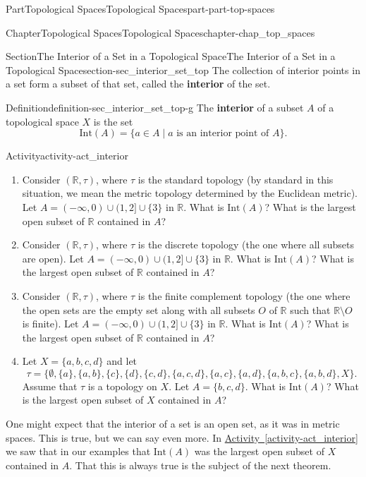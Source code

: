 \documentclass[oneside,10pt,]{book}
\newcommand{\xreffont}{\relax}
\newcommand{\terminology}[1]{\textbf{#1}}
\numberwithin{equation}{chapter}
\newcommand{\R}{\mathbb{R}}
\newcommand{\Int}{\text{Int}}
\begin{document}
\begin{partptx}{Part}{Topological Spaces}{}{Topological Spaces}{}{}{part-part-top-spaces}
\begin{chapterptx}{Chapter}{Topological Spaces}{}{Topological Spaces}{}{}{chapter-chap_top_spaces}
\begin{sectionptx}{Section}{The Interior of a Set in a Topological Space}{}{The Interior of a Set in a Topological Space}{}{}{section-sec_interior_set_top}
The collection of interior points in a set form a subset of that set, called the \terminology{interior} of the set.%
\begin{definition}{Definition}{}{definition-sec_interior_set_top-g}%
The \terminology{interior} of a subset \(A\) of a topological space \(X\) is the set%
\begin{equation*}
\Int(A) = \{a \in A \mid a \text{ is an interior point of }  A\}\text{.}
\end{equation*}
%
\end{definition}
\begin{activity}{Activity}{}{activity-act_interior}%
\begin{enumerate}[font=\bfseries,label=(\alph*),ref=\alph*]%
\item{}Consider \((\R, \tau)\), where \(\tau\) is the standard topology (by standard in this situation, we mean the metric topology determined by the Euclidean metric). Let \(A=(-\infty,0)\cup (1,2]\cup \{3\}\) in \(\R\). What is \(\Int(A)\)? What is the largest open subset of \(\R\) contained in \(A\)?%
\item{}Consider \((\R, \tau)\), where \(\tau\) is the discrete topology (the one where all subsets are open). Let \(A=(-\infty,0) \cup (1,2] \cup \{3\}\) in \(\R\). What is \(\Int(A)\)? What is the largest open subset of \(\R\) contained in \(A\)?%
\item{}Consider \((\R, \tau)\), where \(\tau\) is the finite complement topology (the one where the open sets are the empty set along with all subsets \(O\) of \(\R\) such that \(\R \setminus O\) is finite). Let \(A=(-\infty,0) \cup (1,2] \cup \{3\}\) in \(\R\). What is \(\Int(A)\)? What is the largest open subset of \(\R\) contained in \(A\)?%
\item{}Let \(X = \{a,b,c,d\}\) and let%
\begin{equation*}
\tau = \{\emptyset, \{a\}, \{a,b\}, \{c\}, \{d\}, \{c,d\}, \{a,c,d\}, \{a,c\}, \{a,d\}, \{a,b,c\}, \{a,b,d\}, X\}\text{.}
\end{equation*}
Assume that \(\tau\) is a topology on \(X\). Let \(A = \{b,c,d\}\). What is \(\Int(A)\)? What is the largest open subset of \(X\) contained in \(A\)?%
\end{enumerate}%
\end{activity}%
One might expect that the interior of a set is an open set, as it was in metric spaces. This is true, but we can say even more. In \hyperref[activity-act_interior]{Activity~{\xreffont\ref{activity-act_interior}}} we saw that in our examples that \(\Int(A)\) was the largest open subset of \(X\) contained in \(A\). That this is always true is the subject of the next theorem.%

\end{sectionptx}
\end{chapterptx}
\end{partptx}
\end{document}
